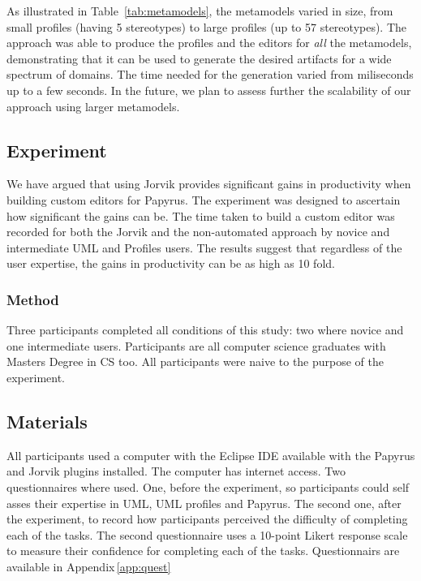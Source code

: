 As illustrated in Table~\ref{tab:metamodels}, the metamodels varied in size, 
from small profiles (having 5 stereotypes) to large profiles (up to 57 
stereotypes). The approach was able to produce the profiles and the editors for 
\textit{all} the metamodels, demonstrating that it can be used to generate the 
desired artifacts for a wide spectrum of domains. The time needed for the 
generation varied from miliseconds up to a few seconds. In the future, we plan 
to assess further the scalability of our approach using larger metamodels.

\subsection{Experiment}
We have argued that using Jorvik provides significant gains in productivity when building custom editors for Papyrus.
The experiment was designed to ascertain how significant the gains can be. The time taken to build a custom editor was recorded for both the Jorvik and the non-automated approach by novice and intermediate UML and Profiles users. The results suggest that regardless of the user expertise, the gains in productivity can be as high as 10 fold.

\subsubsection{Method}
Three participants completed all conditions of this study: two where novice and one intermediate users.
Participants are all computer science graduates with Masters Degree in CS too.
All participants were naive to the purpose of the experiment.

\subsection{Materials}
All participants used a computer with the Eclipse IDE available with the Papyrus and Jorvik plugins installed.
The computer has internet access.
Two questionnaires where used. One, before the experiment, so participants could self asses their expertise in UML, UML profiles and Papyrus.
The second one, after the experiment, to record how participants perceived the difficulty of completing each of the tasks.
The second questionnaire uses a 10-point Likert response scale to measure their confidence for completing each of the tasks.
Questionnairs are available in Appendix\,\ref{app:quest}


